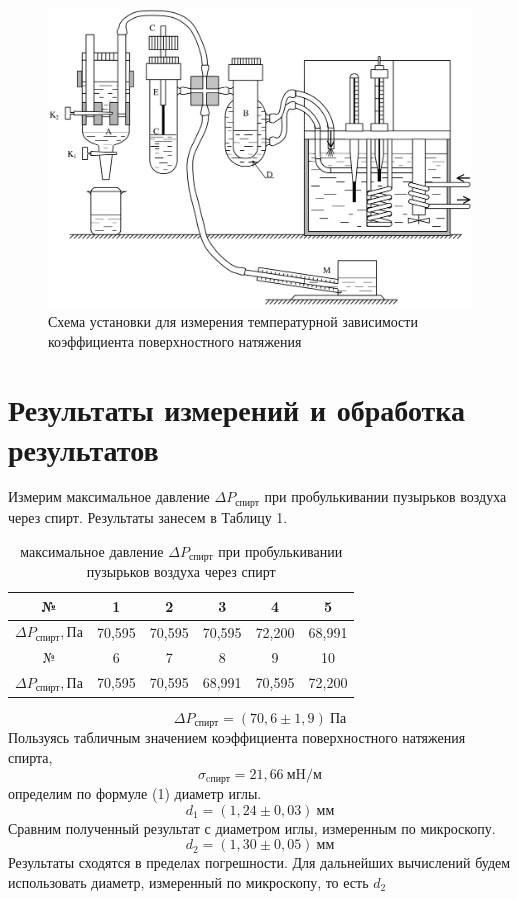 \documentclass[a4paper,12pt]{article}
\theoremstyle{plain} %
\theoremstyle{definition} %
\theoremstyle{remark} %
\begin{document}
	\begin{figure}[H]
		\begin{center}
			\includegraphics[width=\linewidth]{1}
			\captionsetup{justification=centering}
			\caption{Схема установки для измерения температурной зависимости коэффициента поверхностного натяжения}
		\end{center}
	\end{figure}

	\section{Результаты измерений и обработка результатов}
	
	Измерим максимальное давление $\Delta P_\text{спирт}$  при  пробулькивании пузырьков воздуха через спирт. Результаты занесем в Таблицу 1. 
	\begin{table}[H]
		\begin{center}
\begin{tabular}{|c|c|c|c|c|c|}
	\hline
	№ & 1      & 2      & 3      & 4      & 5      \\ \hline
	$\Delta P_\text{спирт}, \text{Па}$ & 70,595 & 70,595 & 70,595 & 72,200 & 68,991 \\ \hline \hline
	№  & 6      & 7      & 8      & 9      & 10     \\ \hline
	$\Delta P_\text{спирт}, \text{Па}$  & 70,595 & 70,595 & 68,991 & 70,595 & 72,200 \\ \hline
		\end{tabular}
	\captionsetup{justification=centering}
		\caption{максимальное давление $\Delta P_\text{спирт}$  при  пробулькивании пузырьков воздуха через спирт}
	\end{center}
	\end{table}
	\[\Delta P_\text{спирт} = (70,6\pm1,9)\ \text{Па} \]
	Пользуясь табличным значением коэффициента поверхностного натяжения спирта, 
	\[\sigma_\text{cпирт} = 21,66\ \text{мH}/\text{м} \]
	определим по формуле (1) диаметр иглы. 
	\[d_1 = (1,24\pm0,03)\ \text{мм} \]
	Сравним полученный результат с диаметром иглы, измеренным по микроскопу.
	\[d_2 = (1,30 \pm 0,05)\ \text{мм}\]
	Результаты сходятся в пределах погрешности. Для дальнейших вычислений будем использовать диаметр, измеренный по микроскопу, то есть $d_2$
	
\end{document}
